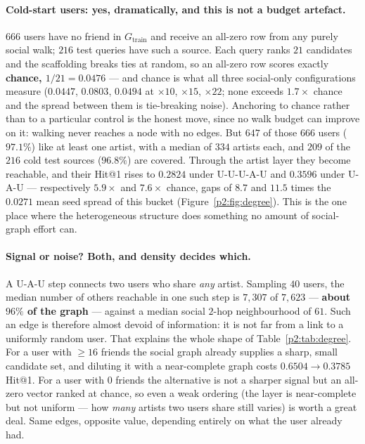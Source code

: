 \paragraph{Cold-start users: yes, dramatically, and this is not a budget artefact.}
$666$ users have no friend in $G_{\mathrm{train}}$ and receive an all-zero row from any
purely social walk; $216$ test queries have such a source.  Each query ranks $21$
candidates and the scaffolding breaks ties at random, so an all-zero row scores exactly
\textbf{chance, $1/21 = 0.0476$} --- and chance is what all three social-only
configurations measure ($0.0447$, $0.0803$, $0.0494$ at $\times10$, $\times15$,
$\times22$; none exceeds $1.7\times$ chance and the spread between them is tie-breaking
noise).  Anchoring to chance rather than to a particular control is the honest move,
since no walk budget can improve on it: walking never reaches a node with no edges.  But $647$ of those $666$ users ($97.1\%$) like at least one artist, with a median
of $334$ artists each, and $209$ of the $216$ cold test sources ($96.8\%$) are covered.
Through the artist layer they become reachable, and their Hit@1 rises to $0.2824$ under
\textsf{U-U-U-A-U} and $0.3596$ under \textsf{U-A-U} --- respectively $5.9\times$ and
$7.6\times$ chance, gaps of $8.7$ and $11.5$ times the $0.0271$ mean seed spread of this
bucket (Figure~\ref{p2:fig:degree}).  This is the one place where the heterogeneous
structure does something no amount of social-graph effort can.

\paragraph{Signal or noise? Both, and density decides which.}
A \textsf{U-A-U} step connects two users who share \emph{any} artist.  Sampling $40$ users,
the median number of others reachable in one such step is $7{,}307$ of $7{,}623$ ---
\textbf{about $96\%$ of the graph} --- against a median social $2$-hop neighbourhood of
$61$.  Such an edge is therefore almost devoid of information: it is not far from a link to
a uniformly random user.  That explains the whole shape of Table~\ref{p2:tab:degree}.  For a
user with $\ge16$ friends the social graph already supplies a sharp, small candidate set,
and diluting it with a near-complete graph costs $0.6504 \to 0.3785$ Hit@1.  For a user with
$0$ friends the alternative is not a sharper signal but an all-zero vector ranked at chance,
so even a weak ordering (the layer is near-complete but not uniform --- how \emph{many}
artists two users share still varies) is worth a great deal.  Same edges, opposite value,
depending entirely on what the user already had.

